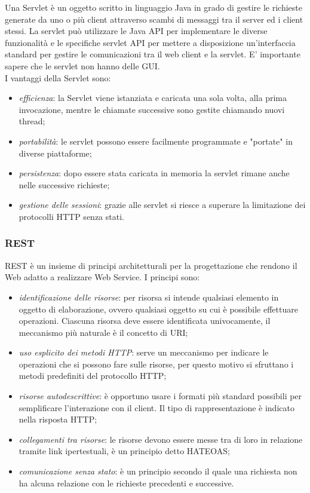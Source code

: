 Una Servlet è un oggetto scritto in linguaggio Java in grado di gestire le richieste generate da uno o più client attraverso scambi di messaggi tra il server ed i client stessi. La servlet può utilizzare le Java API per implementare le diverse funzionalità e le specifiche servlet API per mettere a disposizione un'interfaccia standard per gestire le comunicazioni tra il web client e la servlet. E' importante sapere che le servlet non hanno delle GUI.\\
I vantaggi della Servlet sono:
\begin{itemize}
	\item \textit{efficienza}: la Servlet viene istanziata e caricata una sola volta, alla prima invocazione, mentre le chiamate successive sono gestite chiamando nuovi thread;
	\item \textit{portabilità}: le servlet possono essere facilmente programmate e "portate" in diverse piattaforme;
	\item \textit{persistenza}: dopo essere stata caricata in memoria la servlet rimane anche nelle successive richieste;
	\item \textit{gestione delle sessioni}: grazie alle servlet si riesce a superare la limitazione dei protocolli HTTP senza stati.
\end{itemize}

\subsubsection{REST}

REST è un insieme di principi architetturali per la progettazione che rendono il Web adatto a realizzare Web Service. I principi sono:
\begin{itemize}
	\item \textit{identificazione delle risorse}: per risorsa si intende qualsiasi elemento in oggetto di elaborazione, ovvero qualsiasi oggetto su cui è possibile effettuare operazioni. Ciascuna risorsa deve essere identificata univocamente, il meccanismo più naturale è il concetto di URI;
	\item \textit{uso esplicito dei metodi HTTP}: serve un meccanismo per indicare le operazioni che si possono fare sulle risorse, per questo motivo si sfruttano i metodi predefiniti del protocollo HTTP;
	\item \textit{risorse autodescrittive}: è opportuno usare i formati più standard possibili per semplificare l'interazione con il client. Il tipo di rappresentazione è indicato nella risposta HTTP;
	\item \textit{collegamenti tra risorse}: le risorse devono essere messe tra di loro in relazione tramite link ipertestuali, è un principio detto HATEOAS;
	\item \textit{comunicazione senza stato}: è un principio secondo il quale una richiesta non ha alcuna relazione con le richieste precedenti e successive.
\end{itemize}

